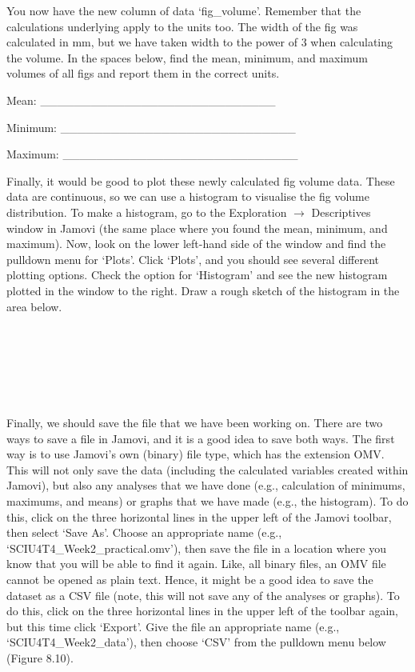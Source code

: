 \documentclass[
]{scrbook}
\begin{document}
You now have the new column of data `fig\_volume'.
Remember that the calculations underlying apply to the units too.
The width of the fig was calculated in mm, but we have taken width to the power of 3 when calculating the volume.
In the spaces below, find the mean, minimum, and maximum volumes of all figs and report them in the correct units.

Mean: \_\_\_\_\_\_\_\_\_\_\_\_\_\_\_\_\_\_\_\_\_\_\_\_\_\_\_\_

Minimum: \_\_\_\_\_\_\_\_\_\_\_\_\_\_\_\_\_\_\_\_\_\_\_\_\_\_\_\_

Maximum: \_\_\_\_\_\_\_\_\_\_\_\_\_\_\_\_\_\_\_\_\_\_\_\_\_\_\_\_

Finally, it would be good to plot these newly calculated fig volume data.
These data are continuous, so we can use a histogram to visualise the fig volume distribution.
To make a histogram, go to the Exploration \(\to\) Descriptives window in Jamovi (the same place where you found the mean, minimum, and maximum).
Now, look on the lower left-hand side of the window and find the pulldown menu for `Plots'.
Click `Plots', and you should see several different plotting options.
Check the option for `Histogram' and see the new histogram plotted in the window to the right.
Draw a rough sketch of the histogram in the area below.

\begin{verbatim}






\end{verbatim}

Finally, we should save the file that we have been working on.
There are two ways to save a file in Jamovi, and it is a good idea to save both ways.
The first way is to use Jamovi's own (binary) file type, which has the extension OMV.
This will not only save the data (including the calculated variables created within Jamovi), but also any analyses that we have done (e.g., calculation of minimums, maximums, and means) or graphs that we have made (e.g., the histogram).
To do this, click on the three horizontal lines in the upper left of the Jamovi toolbar, then select `Save As'.
Choose an appropriate name (e.g., `SCIU4T4\_Week2\_practical.omv'), then save the file in a location where you know that you will be able to find it again.
Like, all binary files, an OMV file cannot be opened as plain text.
Hence, it might be a good idea to save the dataset as a CSV file (note, this will not save any of the analyses or graphs).
To do this, click on the three horizontal lines in the upper left of the toolbar again, but this time click `Export'.
Give the file an appropriate name (e.g., `SCIU4T4\_Week2\_data'), then choose `CSV' from the pulldown menu below (Figure 8.10).
\end{document}
